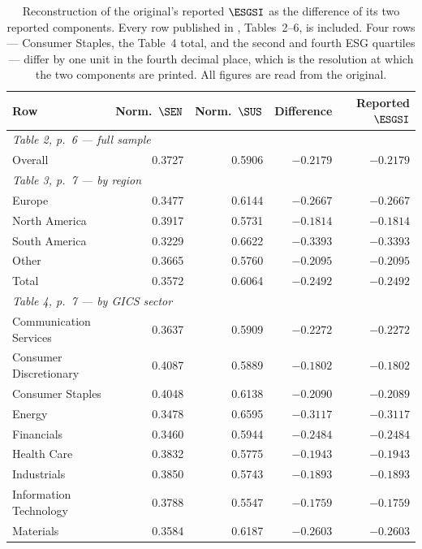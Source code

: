 \begin{table}[htbp]
\centering
\caption{Reconstruction of the original's reported $\ESGSI$ as the difference
of its two reported components. Every row published in \citet{lagasio2024},
Tables~2--6, is included. Four rows --- Consumer Staples, the Table~4 total,
and the second and fourth ESG quartiles --- differ by one unit in the fourth
decimal place, which is the resolution at which the two components are printed.
All figures are read from the original.}
\label{tab:artefact-rows}
\begin{tabular}{lrrrr}
\toprule
Row & Norm.\ $\SEN$ & Norm.\ $\SUS$ & Difference & Reported $\ESGSI$ \\
\midrule
\multicolumn{5}{l}{\emph{Table 2, p.~6 --- full sample}} \\
Overall                & 0.3727 & 0.5906 & $-0.2179$ & $-0.2179$ \\
\midrule
\multicolumn{5}{l}{\emph{Table 3, p.~7 --- by region}} \\
Europe                 & 0.3477 & 0.6144 & $-0.2667$ & $-0.2667$ \\
North America          & 0.3917 & 0.5731 & $-0.1814$ & $-0.1814$ \\
South America          & 0.3229 & 0.6622 & $-0.3393$ & $-0.3393$ \\
Other                  & 0.3665 & 0.5760 & $-0.2095$ & $-0.2095$ \\
Total                  & 0.3572 & 0.6064 & $-0.2492$ & $-0.2492$ \\
\midrule
\multicolumn{5}{l}{\emph{Table 4, p.~7 --- by GICS sector}} \\
Communication Services & 0.3637 & 0.5909 & $-0.2272$ & $-0.2272$ \\
Consumer Discretionary & 0.4087 & 0.5889 & $-0.1802$ & $-0.1802$ \\
Consumer Staples       & 0.4048 & 0.6138 & $-0.2090$ & $-0.2089$ \\
Energy                 & 0.3478 & 0.6595 & $-0.3117$ & $-0.3117$ \\
Financials             & 0.3460 & 0.5944 & $-0.2484$ & $-0.2484$ \\
Health Care            & 0.3832 & 0.5775 & $-0.1943$ & $-0.1943$ \\
Industrials            & 0.3850 & 0.5743 & $-0.1893$ & $-0.1893$ \\
Information Technology & 0.3788 & 0.5547 & $-0.1759$ & $-0.1759$ \\
Materials              & 0.3584 & 0.6187 & $-0.2603$ & $-0.2603$ \\

\end{tabular}
\end{table}
